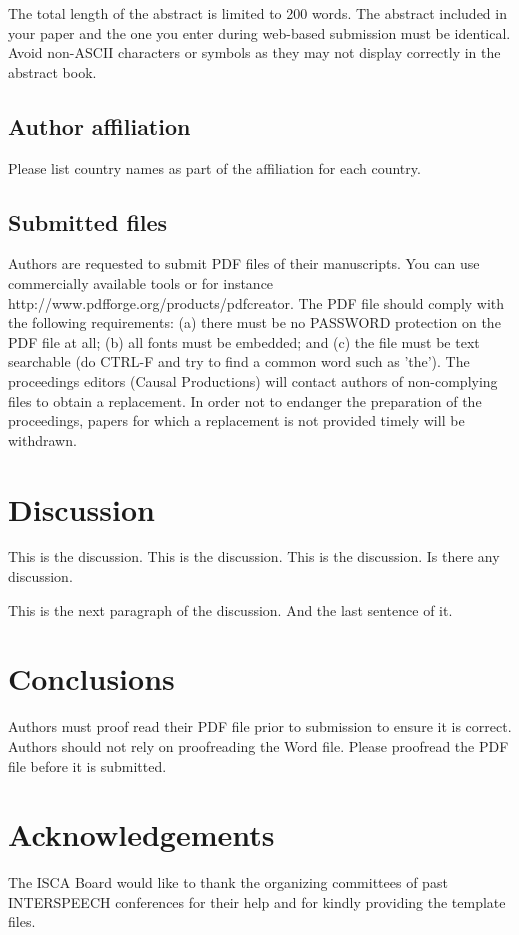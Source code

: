 \documentclass[a4paper]{article}
\begin{document}
The total length of the abstract is limited to 200 words. The
abstract included in your paper and the one you enter during web-based
submission must be identical. Avoid non-ASCII characters or symbols as they
may not display correctly in the abstract book.

\subsection{Author affiliation}
Please list country names as part of the affiliation for each country.

\subsection{Submitted files}
Authors are requested to submit PDF files of their manuscripts. You
can use commercially available tools or for instance
http://www.pdfforge.org/products/pdfcreator.  The PDF file should
comply with the following requirements: (a) there must be no PASSWORD
protection on the PDF file at all; (b) all fonts must be embedded; and
(c) the file must be text searchable (do CTRL-F and try to find a
common word such as 'the'). The proceedings editors (Causal
Productions) will contact authors of non-complying files to obtain a
replacement. In order not to endanger the preparation of the
proceedings, papers for which a replacement is not provided timely
will be withdrawn.

\section{Discussion}
This is the discussion. This is the discussion. This is the discussion. 
Is there any discussion.

This is the next paragraph of the discussion. And the last sentence of it.


\section{Conclusions}

Authors must proof read their PDF file prior to submission to ensure it is 
correct. Authors should not rely on proofreading the Word file. Please 
proofread the PDF file before it is submitted.

\section{Acknowledgements}
The ISCA Board would like to thank the organizing committees of past INTERSPEECH conferences for their help and for kindly providing the template files.
\end{document}
